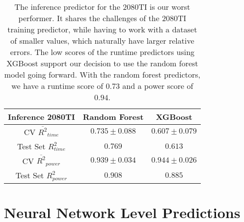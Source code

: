 \begin{table}[h!]
\centering
\begin{tabular}{|c|c|c|}
\hline
 \textbf{Inference 2080TI}& \textbf{Random Forest} & \textbf{XGBoost} \\
\hline
CV $\overline{R^2}_{time}$ & $0.735 \pm 0.088$ &  $0.607 \pm 0.079$ \\
\hline
Test Set $R^2_{time}$ & $0.769$ & $0.613$ \\
\hline
CV $\overline{R^2}_{power}$ & $0.939 \pm 0.034$  &  $0.944 \pm 0.026$\\
\hline
Test Set $R^2_{power}$ & $0.908$ & $0.885$ \\
\hline
\end{tabular}
\caption{The inference predictor for the 2080TI is our worst performer. It shares the challenges of the 2080TI training predictor, while having to work with a dataset of smaller values, which naturally have larger relative errors. The low scores of the runtime predictors using XGBoost support our decision to use the random forest model going forward. With the random forest predictors, we have a runtime score of $0.73$ and a power score of $0.94$.}
\label{tab:pred_res_2080_inf}
\end{table}

\FloatBarrier


\section{Neural Network Level Predictions}


